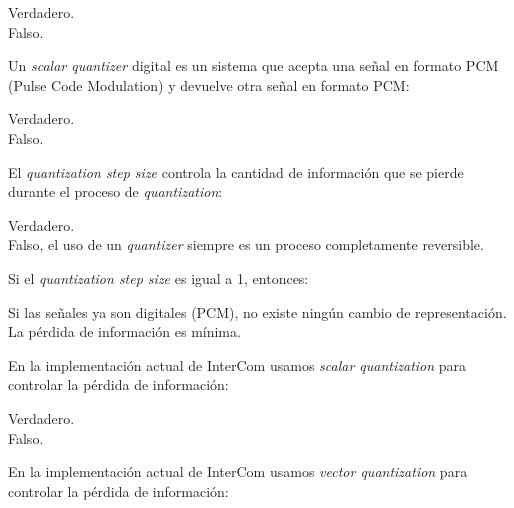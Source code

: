 \documentclass[legalpaper, 12pt, addpoints]{exam}
\begin{document}
\begin{questions}
\begin{oneparchoices}
  \choice Verdadero.\\
  \choice Falso.
\end{oneparchoices}
  
\vspace{0.10in}

\question Un \emph{scalar quantizer} digital es un sistema que acepta
una señal en formato PCM (Pulse Code Modulation) y devuelve otra señal
en formato PCM:

\begin{oneparchoices}
  \choice Verdadero.\\
  \choice Falso.
\end{oneparchoices}
  
\vspace{0.10in}

\question El \emph{quantization step size} controla la cantidad de
información que se pierde durante el proceso de \emph{quantization}:

\begin{oneparchoices}
  \choice Verdadero.\\
  \choice Falso, el uso de un \emph{quantizer} siempre es un proceso completamente reversible.
\end{oneparchoices}
  
\vspace{0.10in}

\question Si el \emph{quantization step size} es igual a 1, entonces:

\begin{oneparchoices}
  \choice Si las señales ya son digitales (PCM), no existe ningún cambio de representación.\\
  \choice La pérdida de información es mínima.
\end{oneparchoices}
  
\vspace{0.10in}

\question En la implementación actual de InterCom usamos \emph{scalar
quantization} para controlar la pérdida de información:

\begin{oneparchoices}
  \choice Verdadero.\\
  \choice Falso.
\end{oneparchoices}
  
\vspace{0.10in}

\question En la implementación actual de InterCom usamos \emph{vector
quantization} para controlar la pérdida de información:


\end{questions}
\end{document}
